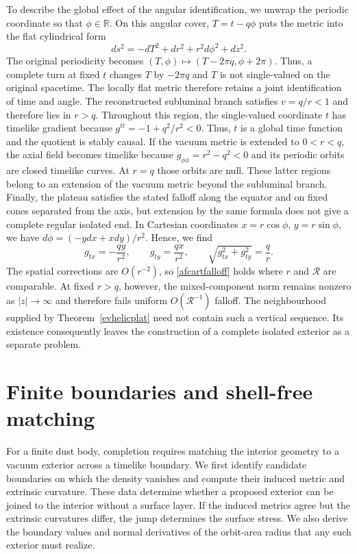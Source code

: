 \documentclass[amsmath,amsfonts,amssymb,aps,pra,superscriptaddress,10pt]{revtex4-2}
\numberwithin{equation}{section}
\theoremstyle{plain}
\theoremstyle{definition}
\theoremstyle{remark}
\theoremstyle{definition}
\begin{document}
To describe the global effect of the angular identification, we unwrap the periodic coordinate so that $\phi\in\mathbb{R}$. On this angular cover, $T=t-q\phi$ puts the metric into the flat cylindrical form
\begin{equation}
ds^2=-dT^2+dr^2+r^2d\phi^2+dz^2.
\end{equation}
The original periodicity becomes $(T,\phi)\mapsto(T-2\pi q,\phi+2\pi)$. Thus, a complete turn at fixed $t$ changes $T$ by $-2\pi q$ and $T$ is not single-valued on the original spacetime. The locally flat metric therefore retains a joint identification of time and angle. The reconstructed subluminal branch satisfies $v=q/r<1$ and therefore lies in $r>q$. Throughout this region, the single-valued coordinate $t$ has timelike gradient because $g^{tt}=-1+q^2/r^2<0$. Thus, $t$ is a global time function and the quotient is stably causal. If the vacuum metric is extended to $0<r<q$, the axial field becomes timelike because $g_{\phi\phi}=r^2-q^2<0$ and its periodic orbits are closed timelike curves. At $r=q$ those orbits are null. These latter regions belong to an extension of the vacuum metric beyond the subluminal branch. Finally, the plateau satisfies the stated falloff along the equator and on fixed cones separated from the axis, but extension by the same formula does not give a complete regular isolated end. In Cartesian coordinates $x=r\cos{\phi}$, $y=r\sin{\phi}$, we have $d\phi=(-ydx+xdy)/r^2$. Hence, we find
\begin{equation}
g_{tx}=-\frac{qy}{r^2},\qquad
g_{ty}=\frac{qx}{r^2},\qquad
\sqrt{g_{tx}^2+g_{ty}^2}=\frac{q}{r}.
\end{equation}
The spatial corrections are $O(r^{-2})$, so \eqref{afcartfalloff} holds where $r$ and $\mathcal{R}$ are comparable. At fixed $r>q$, however, the mixed-component norm remains nonzero as $|z|\to\infty$ and therefore fails uniform $O(\mathcal{R}^{-1})$ falloff. The neighbourhood supplied by Theorem~\ref{evhelicplat} need not contain such a vertical sequence. Its existence consequently leaves the construction of a complete isolated exterior as a separate problem.

\section{Finite boundaries and shell-free matching}\label{vacmatch}

For a finite dust body, completion requires matching the interior geometry to a vacuum exterior across a timelike boundary. We first identify candidate boundaries on which the density vanishes and compute their induced metric and extrinsic curvature. These data determine whether a proposed exterior can be joined to the interior without a surface layer. If the induced metrics agree but the extrinsic curvatures differ, the jump determines the surface stress. We also derive the boundary values and normal derivatives of the orbit-area radius that any such exterior must realize.
\end{document}
